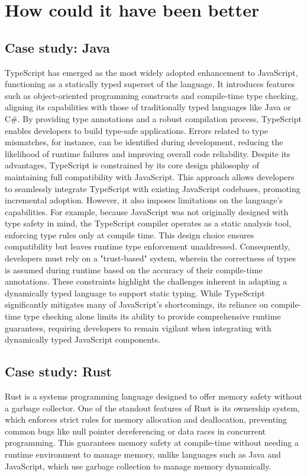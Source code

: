 \section{How could it have been better}

\subsection{Case study: Java}

TypeScript has emerged as the most widely adopted enhancement to JavaScript, functioning as a statically typed superset of the language. It introduces features such as object-oriented programming constructs and compile-time type checking, aligning its capabilities with those of traditionally typed languages like Java or C\#. By providing type annotations and a robust compilation process, TypeScript enables developers to build type-safe applications. Errors related to type mismatches, for instance, can be identified during development, reducing the likelihood of runtime failures and improving overall code reliability. Despite its advantages, TypeScript is constrained by its core design philosophy of maintaining full compatibility with JavaScript. This approach allows developers to seamlessly integrate TypeScript with existing JavaScript codebases, promoting incremental adoption. However, it also imposes limitations on the language’s capabilities. For example, because JavaScript was not originally designed with type safety in mind, the TypeScript compiler operates as a static analysis tool, enforcing type rules only at compile time. This design choice ensures compatibility but leaves runtime type enforcement unaddressed. Consequently, developers must rely on a "trust-based" system, wherein the correctness of types is assumed during runtime based on the accuracy of their compile-time annotations. These constraints highlight the challenges inherent in adapting a dynamically typed language to support static typing. While TypeScript significantly mitigates many of JavaScript’s shortcomings, its reliance on compile-time type checking alone limits its ability to provide comprehensive runtime guarantees, requiring developers to remain vigilant when integrating with dynamically typed JavaScript components.

\subsection{Case study: Rust}

Rust is a systems programming language designed to offer memory safety without a garbage collector. One of the standout features of Rust is its ownership system, which enforces strict rules for memory allocation and deallocation, preventing common bugs like null pointer dereferencing or data races in concurrent programming. This guarantees memory safety at compile-time without needing a runtime environment to manage memory, unlike languages such as Java and JavaScript, which use garbage collection to manage memory dynamically.

